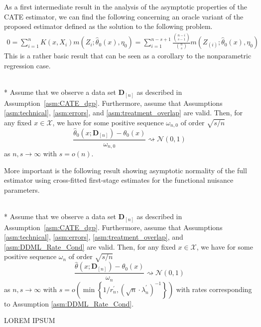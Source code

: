 As a first intermediate result in the analysis of the asymptotic properties of the CATE estimator, we can find the following concerning an oracle variant of the proposed estimator defined as the solution to the following problem.
\begin{equation}
    \begin{aligned}
        0 
        = \sum_{i = 1}^{n} K(x, X_{i}) m\left(Z_{i}; \hat{\theta}_{0}(x), \eta_{0}\right)
        = \sum_{i = 1}^{n - s + 1} \frac{\binom{n-i}{s-1}}{\binom{n}{s}} m\left(Z_{(i)}; \hat{\theta}_{0}(x),\eta_{0}\right)
    \end{aligned}
\end{equation}
This is a rather basic result that can be seen as a corollary to the nonparametric regression case.
\begin{boxD}
	\begin{thm}\label{thm:DNNDML2_anorm_0}\mbox{}\\*
		Assume that we observe a data set $\mathbf{D}_{[n]}$ as described in Assumption~\ref{asm:CATE_dgp}. 
        Furthermore, assume that Assumptions \ref{asm:technical}, \ref{asm:errors}, and \ref{asm:treatment_overlap} are valid.
		Then, for any fixed $x \in \mathcal{X}$, we have for some positive sequence $\omega_{n,0}$ of order $\sqrt{s/n}$
		\begin{equation}
			\frac{\hat{\theta}_{0}(x; \mathbf{D}_{[n]}) - \theta_{0}(x)}{\omega_{n,0}}
			\rightsquigarrow \mathcal{N}\left(0,1\right)
		\end{equation}
		as $n,s \rightarrow \infty$ with $s = o(n)$.
	\end{thm}
\end{boxD}
More important is the following result showing asymptotic normality of the full estimator using cross-fitted first-stage estimates for the functional nuisance parameters.
\begin{boxD}
	\begin{thm}\label{thm:DNNDML2_anorm}\mbox{}\\*
		Assume that we observe a data set $\mathbf{D}_{[n]}$ as described in Assumption~\ref{asm:CATE_dgp}.
        Furthermore, assume that Assumptions \ref{asm:technical}, \ref{asm:errors}, \ref{asm:treatment_overlap}, and \ref{asm:DDML_Rate_Cond} are valid.
		Then, for any fixed $x \in \mathcal{X}$, we have for some positive sequence $\omega_n$ of order $\sqrt{s/n}$
		\begin{equation}
			\frac{\hat{\theta}(x; \mathbf{D}_{[n]}) - \theta_{0}(x)}{\omega_n}
			\rightsquigarrow \mathcal{N}\left(0,1\right)
		\end{equation}
		as $n,s \rightarrow \infty$ with $s = o\left(\min\left\{1/r_{n}^{\prime}, \left(\sqrt{n} \cdot \lambda_{n}^{\prime}\right)^{-1}\right\}\right)$ with rates corresponding to Assumption \ref{asm:DDML_Rate_Cond}.
	\end{thm}
\end{boxD}
{\color{red} LOREM IPSUM}

